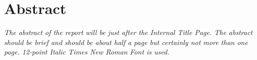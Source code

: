 \chapter*{Abstract}\label{ch:abstract}
\textit{The abstract of the report will be just after the Internal Title Page. The abstract should be brief and should be about half a page but certainly not more than one page. 12-point Italic Times New Roman Font is used.}
